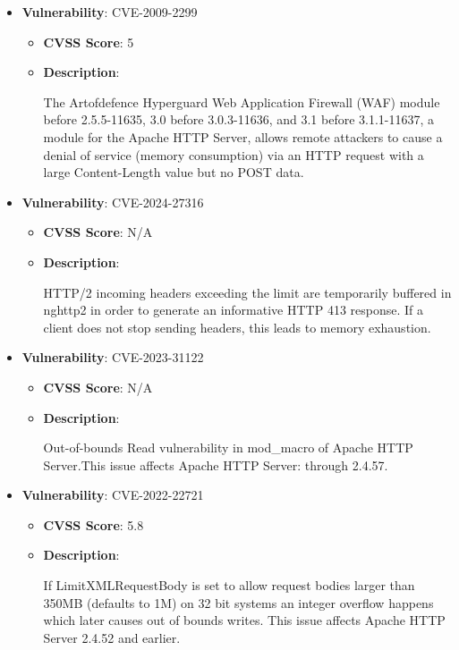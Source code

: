 \documentclass{article}
\begin{document}
\begin{itemize}
        \item \textbf{Vulnerability}: CVE-2009-2299
        \begin{itemize}
            \item \textbf{CVSS Score}:  5 
            \item \textbf{Description}:
            \parbox[t]{0.9\linewidth}{
                \ttfamily The Artofdefence Hyperguard Web Application Firewall (WAF) module before 2.5.5-11635, 3.0 before 3.0.3-11636, and 3.1 before 3.1.1-11637, a module for the Apache HTTP Server, allows remote attackers to cause a denial of service (memory consumption) via an HTTP request with a large Content-Length value but no POST data.
            }
        \end{itemize}
    
        \item \textbf{Vulnerability}: CVE-2024-27316
        \begin{itemize}
            \item \textbf{CVSS Score}:  N/A 
            \item \textbf{Description}:
            \parbox[t]{0.9\linewidth}{
                \ttfamily HTTP/2 incoming headers exceeding the limit are temporarily buffered in nghttp2 in order to generate an informative HTTP 413 response. If a client does not stop sending headers, this leads to memory exhaustion.
            }
        \end{itemize}
    
        \item \textbf{Vulnerability}: CVE-2023-31122
        \begin{itemize}
            \item \textbf{CVSS Score}:  N/A 
            \item \textbf{Description}:
            \parbox[t]{0.9\linewidth}{
                \ttfamily Out-of-bounds Read vulnerability in mod\_macro of Apache HTTP Server.This issue affects Apache HTTP Server: through 2.4.57.
            }
        \end{itemize}
    
        \item \textbf{Vulnerability}: CVE-2022-22721
        \begin{itemize}
            \item \textbf{CVSS Score}:  5.8 
            \item \textbf{Description}:
            \parbox[t]{0.9\linewidth}{
                \ttfamily If LimitXMLRequestBody is set to allow request bodies larger than 350MB (defaults to 1M) on 32 bit systems an integer overflow happens which later causes out of bounds writes. This issue affects Apache HTTP Server 2.4.52 and earlier.
            }
        \end{itemize}
    

\end{itemize}
\end{document}
